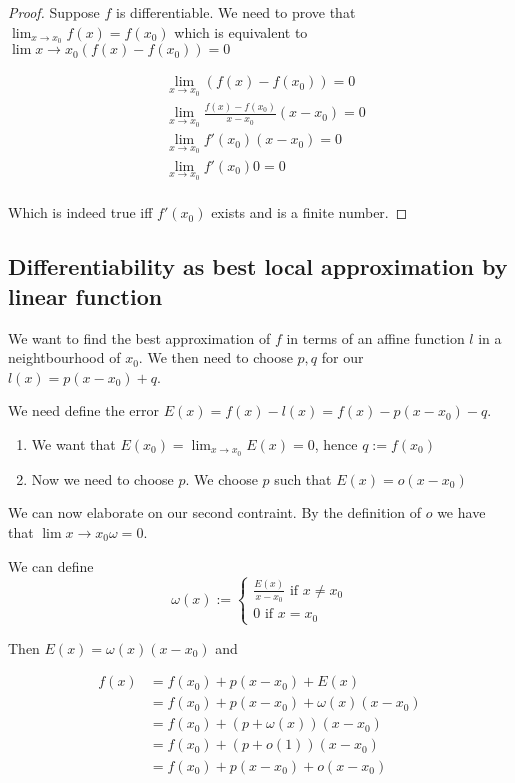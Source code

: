 \documentclass[17pt]{extarticle}
\begin{document}
\begin{proof}
  Suppose $f$ is differentiable.
  We need to prove that $\lim_{x \to x_0} f(x) = f(x_0)$ which is equivalent to $\lim{x \to x_0} (f(x) - f(x_0)) = 0$

  \begin{align*}
     & \lim_{x \to x_0} \left(f(x) - f(x_0)\right) = 0          \\
     & \lim_{x \to x_0} \frac{f(x) - f(x_0)}{x-x_0} (x-x_0) = 0 \\
     & \lim_{x \to x_0} f'(x_0) (x-x_0) = 0                     \\
     & \lim_{x \to x_0} f'(x_0) 0 = 0                           \\
  \end{align*}

  Which is indeed true iff $f'(x_0)$ exists and is a finite number.
\end{proof}

\subsection{Differentiability as best local approximation by linear function}

We want to find the best approximation of $f$ in terms of an affine function $l$ in a neightbourhood of $x_0$.
We then need to choose $p, q$ for our $l(x) = p(x-x_0) + q$.

We need define the error $E(x) = f(x) - l(x) = f(x) - p(x-x_0) - q$.

\begin{enumerate}
  \item We want that $E(x_0) = \lim_{x \to x_0} E(x) = 0$, hence $q := f(x_0)$
  \item Now we need to choose $p$. We choose $p$ such that $E(x) = o(x-x_0)$
\end{enumerate}

We can now elaborate on our second contraint.
By the definition of $o$ we have that
$\lim{x \to x_0} \omega = 0$.

We can define
$$
  \omega (x) := \begin{cases}
    \frac{E(x)}{x-x_0} \text{ if } x \ne x_0 \\
    0  \text{ if } x = x_0
  \end{cases}
$$

Then $E(x) = \omega (x)(x - x_0)$ and

\begin{align*}
  f(x) & = f(x_0) + p(x - x_0) + E(x)              \\
       & = f(x_0) + p(x - x_0) + \omega (x)(x-x_0) \\
       & = f(x_0) + (p + \omega(x))(x-x_0)         \\
       & = f(x_0) + (p + o(1))(x-x_0)              \\
       & = f(x_0) + p(x - x_0) + o(x-x_0)
\end{align*}
\end{document}

